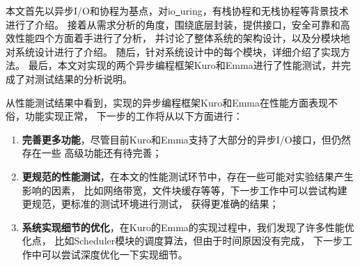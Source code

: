\documentclass[supercite]{HustGraduPaper}
\theoremstyle{definition}
\begin{document}
本文首先以异步I/O和协程为基点，对io\underline{~}uring，有栈协程和无栈协程等背景技术进行了介绍。
接着从需求分析的角度，围绕底层封装，提供接口，安全可靠和高效性能四个方面着手进行了分析，
并讨论了整体系统的架构设计，以及分模块地对系统设计进行了介绍。
随后，针对系统设计中的每个模块，详细介绍了实现方法。
最后，本文对实现的两个异步编程框架Kuro和Emma进行了性能测试，并完成了对测试结果的分析说明。\par

从性能测试结果中看到，实现的异步编程框架Kuro和Emma在性能方面表现不俗，功能实现正常，
下一步的工作将从以下方面进行：

\begin{enumerate}
  \item \textbf{完善更多功能}，尽管目前Kuro和Emma支持了大部分的异步I/O接口，但仍然存在一些
    高级功能还有待完善；
  \item \textbf{更规范的性能测试}，在本文的性能测试环节中，存在一些可能对实验结果产生影响的因素，
    比如网络带宽，文件块缓存等等，下一步工作中可以尝试构建更规范，更标准的测试环境进行测试，
    获得更准确的结果；
  \item \textbf{系统实现细节的优化}，在Kuro的Emma的实现过程中，我们发现了许多性能优化点，
    比如Scheduler模块的调度算法，但由于时间原因没有完成，
    下一步工作中可以尝试深度优化一下实现细节。
\end{enumerate}
\end{document}
